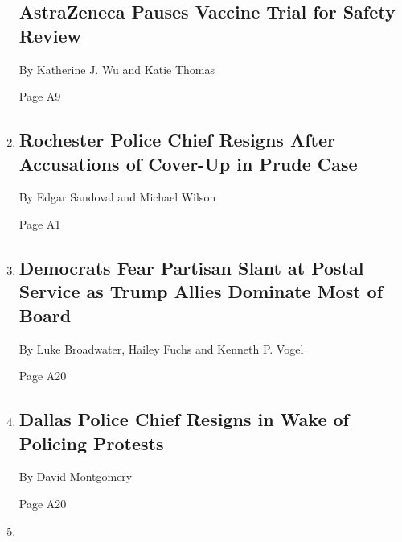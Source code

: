 \begin{enumerate}
{  \subsection{AstraZeneca Pauses Vaccine Trial for Safety
  Review}\label{astrazeneca-pauses-vaccine-trial-for-safety-review}}

  By Katherine J. Wu and Katie Thomas

  Page A9
\item
  \href{/2020/09/08/nyregion/rochester-police-chief-resigns-prude.html}{}

  \hypertarget{rochester-police-chief-resigns-after-accusations-of-cover-up-in-prude-case}{%
  \subsection{Rochester Police Chief Resigns After Accusations of
  Cover-Up in Prude
  Case}\label{rochester-police-chief-resigns-after-accusations-of-cover-up-in-prude-case}}

  By Edgar Sandoval and Michael Wilson

  Page A1
\item
  \href{/2020/09/08/us/politics/democrats-postal-service-board-trump.html}{}

  \hypertarget{democrats-fear-partisan-slant-at-postal-service-as-trump-allies-dominate-most-of-board}{%
  \subsection{Democrats Fear Partisan Slant at Postal Service as Trump
  Allies Dominate Most of
  Board}\label{democrats-fear-partisan-slant-at-postal-service-as-trump-allies-dominate-most-of-board}}

  By Luke Broadwater, Hailey Fuchs and Kenneth P. Vogel

  Page A20
\item
  \href{/2020/09/08/us/dallas-police-chief-resigns-renee-hall.html}{}

  \hypertarget{dallas-police-chief-resigns-in-wake-of-policing-protests}{%
  \subsection{Dallas Police Chief Resigns in Wake of Policing
  Protests}\label{dallas-police-chief-resigns-in-wake-of-policing-protests}}

  By David Montgomery

  Page A20
\item
  \href{/interactive/2020/09/04/world/asia/hong-kong-speech.html}{}


\end{enumerate}
